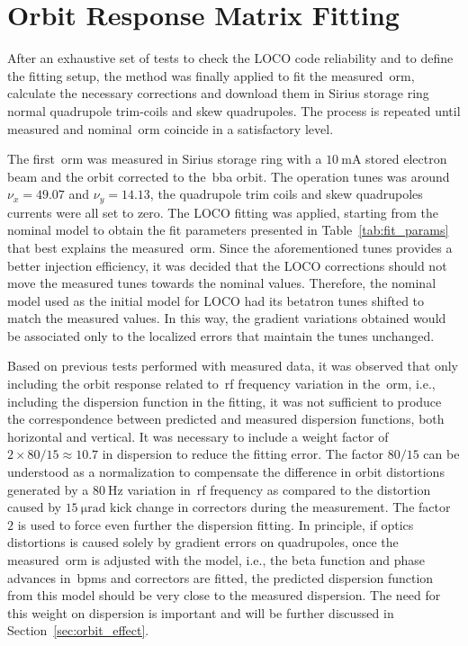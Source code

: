 \section{Orbit Response Matrix Fitting}\label{sec:orm_fit}
After an exhaustive set of tests to check the LOCO code reliability and to define the fitting setup, the method was finally applied to fit the measured~\gls{orm}, calculate the necessary corrections and download them in Sirius storage ring normal quadrupole trim-coils and skew quadrupoles. The process is repeated until measured and nominal~\gls{orm} coincide in a satisfactory level.

The first~\gls{orm} was measured in Sirius storage ring with a $\SI{10}{\milli\ampere}$ stored electron beam and the orbit corrected to the~\gls{bba} orbit. The operation tunes was around $\nu_x = 49.07$ and $\nu_y = 14.13$, the quadrupole trim coils and skew quadrupoles currents were all set to zero. The LOCO fitting was applied, starting from the nominal model to obtain the fit parameters presented in Table~\ref{tab:fit_params} that best explains the measured~\gls{orm}. Since the aforementioned tunes provides a better injection efficiency, it was decided that the LOCO corrections should not move the measured tunes towards the nominal values. Therefore, the nominal model used as the initial model for LOCO had its betatron tunes shifted to match the measured values. In this way, the gradient variations obtained would be associated only to the localized errors that maintain the tunes unchanged.

Based on previous tests performed with measured data, it was observed that only including the orbit response related to~\gls{rf} frequency variation in the~\gls{orm}, i.e., including the dispersion function in the fitting, it was not sufficient to produce the correspondence between predicted and measured dispersion functions, both horizontal and vertical. It was necessary to include a weight factor of $2 \times 80/15 \approx 10.7$ in dispersion to reduce the fitting error. The factor $80/15$ can be understood as a normalization to compensate the difference in orbit distortions generated by a $\SI{80}{\hertz}$ variation in~\gls{rf} frequency as compared to the distortion caused by $\SI{15}{\micro\radian}$ kick change in correctors during the measurement. The factor $2$ is used to force even further the dispersion fitting. In principle, if optics distortions is caused solely by gradient errors on quadrupoles, once the measured~\gls{orm} is adjusted with the model, i.e., the beta function and phase advances in~\glspl{bpm} and correctors are fitted, the predicted dispersion function from this model should be very close to the measured dispersion. The need for this weight on dispersion is important and will be further discussed in Section~\ref{sec:orbit_effect}.

